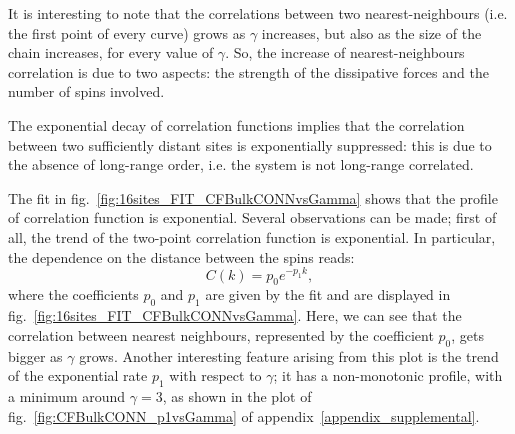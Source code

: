 It is interesting to note that the correlations between two nearest-neigh\-bours (i.e. the first point of every curve) grows as $\gamma$ increases, but also as the size of the chain increases, for every value of $\gamma$. So, the increase of nearest-neighbours correlation is due to two aspects: the strength of the dissipative forces and the number of spins involved.

The exponential decay of correlation functions implies that the correlation between two sufficiently distant sites is exponentially suppressed: this is due to the absence of long-range order, i.e. the system is not long-range correlated.



The fit in fig.~\ref{fig:16sites_FIT_CFBulkCONNvsGamma} shows that the profile of correlation function is exponential. Several observations can be made; first of all, the trend of the two-point correlation function is exponential. In particular, the dependence on the distance between the spins reads:
\begin{equation}
    C(k) = p_0 e^{-p_1 k},
\end{equation}
where the coefficients $p_0$ and $p_1$ are given by the fit and are displayed in fig.~\ref{fig:16sites_FIT_CFBulkCONNvsGamma}. Here, we can see that the correlation between nearest neighbours, represented by the coefficient $p_0$, gets bigger as $\gamma$ grows. Another interesting feature arising from this plot is the trend of the exponential rate $p_1$ with respect to $\gamma$; it has a non-monotonic profile, with a minimum around $\gamma = 3$, as shown in the plot of fig.~\ref{fig:CFBulkCONN_p1vsGamma} of appendix~\ref{appendix_supplemental}. %

